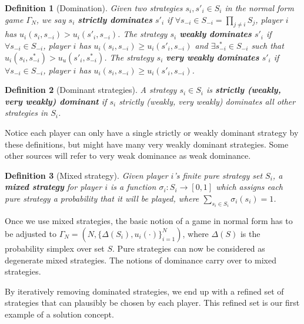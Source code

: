 \documentclass[letter, 10pt]{article}
\theoremstyle{basic}
\newtheorem{definition}{Definition}[section]
\newcommand{\noti}{{{\scriptscriptstyle-}\!i}}
\begin{document}
\begin{spacing}{1.1}
\begin{definition}[Domination]
  Given two strategies $s_i, s'_i \in S_i$ in the
  normal form game $\Gamma_N$, we say $s_i$ \textbf{strictly dominates}
  $s'_i$ if $\forall s_\noti \in S_\noti = \prod_{j\neq i} S_j$, player $i$ has
  $u_i(s_i,s_\noti) > u_i(s'_i, s_\noti)$. The strategy $s_i$ \textbf{weakly
    dominates} $s'_i$ if $\forall s_\noti \in S_\noti$,
  player $i$ has $u_i(s_i,s_\noti) \ge u_i(s'_i, s_\noti)$ and $\exists
  s^*_\noti \in S_\noti$ such that $u_i(s_i, s^*_\noti) > u_u(s'_i,
  s^*_\noti)$. The strategy $s_i$ \textbf{very weakly
    dominates} $s'_i$ if $\forall s_\noti \in S_\noti$,
  player $i$ has $u_i(s_i,s_\noti) \ge u_i(s'_i, s_\noti)$.
\end{definition}

\begin{definition}[Dominant strategies]
  A strategy $s_i \in S_i$ is \textbf{strictly (weakly, very weakly)
    dominant} if $s_i$ strictly (weakly, very weakly) dominates all other
  strategies in $S_i$.
\end{definition}

Notice each player can only have a single strictly or weakly dominant
strategy by these definitions, but might have many very weakly dominant
strategies. Some other sources will refer to very weak dominance as weak dominance.

\begin{definition}[Mixed strategy]
  Given player $i$'s finite pure
  strategy set $S_i$, a \textbf{mixed strategy} for player $i$ is
  a function $\sigma_i : S_i \to [0,1]$ which assigns
  each pure strategy a probability that it will be
  played, where $\sum_{s_i\in S_i} \sigma_i(s_i) = 1$.
\end{definition}

Once we use mixed strategies, the basic notion of a game in normal form has
to be adjusted to $\Gamma_N = \left(N, \{\Delta(S_i),
  u_i(\cdot)\}_{i=1}^N\right)$, where $\Delta(S)$ is the probability
simplex over set $S$. Pure strategies can now be considered as degenerate
mixed strategies. The notions of dominance carry over to mixed
strategies.

\hspace{1em}
By iteratively removing dominated strategies, we end up with a refined set
of strategies that can plausibly be chosen by each player. This refined set
is our first example of a solution concept.


\end{spacing}
\end{document}
